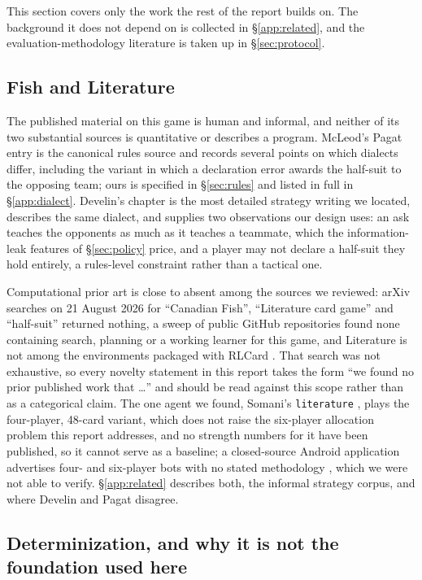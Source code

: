 \documentclass[11pt]{article}
\theoremstyle{definition}
\begin{document}
This section covers only the work the rest of the report builds on. The
background it does not depend on is collected in \S\ref{app:related}, and the
evaluation-methodology literature is taken up in \S\ref{sec:protocol}.

\subsection{Fish and Literature}

The published material on this game is human and informal, and neither of its
two substantial sources is quantitative or describes a program. McLeod's Pagat
entry \cite{pagat} is the canonical rules source and records several points on
which dialects differ, including the variant in which a declaration error awards
the half-suit to the opposing team; ours is specified in \S\ref{sec:rules} and
listed in full in \S\ref{app:dialect}. Develin's chapter \cite{develin} is the
most detailed strategy writing we located, describes the same dialect, and
supplies two observations our design uses: an ask teaches the opponents as much
as it teaches a teammate, which the information-leak features of
\S\ref{sec:policy} price, and a player may not declare a half-suit they hold
entirely, a rules-level constraint rather than a tactical one.

Computational prior art is close to absent among the sources we reviewed:
arXiv searches on 21 August 2026 for ``Canadian Fish'', ``Literature card
game'' and ``half-suit'' returned nothing, a sweep of public GitHub
repositories found none containing search, planning or a working learner for
this game, and Literature is not among the environments packaged with RLCard
\cite{rlcard}. That search was not exhaustive, so every novelty statement in
this report takes the form ``we found no prior published work that \dots'' and
should be read against this scope rather than as a categorical claim. The one
agent we found, Somani's \texttt{literature} \cite{somani,somani-server}, plays
the four-player, 48-card variant, which does not raise the six-player
allocation problem this report addresses, and no strength numbers for it have
been published, so it cannot serve as a baseline; a closed-source Android
application advertises four- and six-player bots with no stated methodology
\cite{playstore}, which we were not able to verify. \S\ref{app:related}
describes both, the informal strategy corpus, and where Develin and Pagat
disagree.

\subsection{Determinization, and why it is not the foundation used here}
\end{document}
